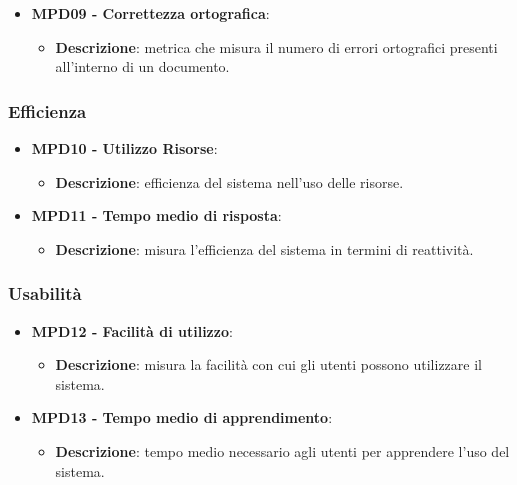 \documentclass[10pt]{article}
\begin{document}
\begin{justify}
\begin{itemize}
    \item \textbf{MPD09 - Correttezza ortografica}:
    \begin{itemize}
        \item \textbf{Descrizione}: metrica che misura il numero di errori ortografici presenti all'interno di un documento.
    \end{itemize}
\end{itemize}

\subsubsection{Efficienza}
\begin{itemize}
    \item \textbf{MPD10 - Utilizzo Risorse}:
    \begin{itemize}
        \item \textbf{Descrizione}: efficienza del sistema nell'uso delle risorse.
    \end{itemize}
    \item \textbf{MPD11 - Tempo medio di risposta}:
    \begin{itemize}
        \item \textbf{Descrizione}: misura l'efficienza del sistema in termini di reattività.
    \end{itemize}
\end{itemize}

\subsubsection{Usabilità}
\begin{itemize}
    \item \textbf{MPD12 - Facilità di utilizzo}:
        \begin{itemize}
            \item \textbf{Descrizione}:  misura la facilità con cui gli utenti possono utilizzare il sistema.
        \end{itemize}
    \item \textbf{MPD13 - Tempo medio di apprendimento}:
        \begin{itemize}
            \item \textbf{Descrizione}: tempo medio necessario agli utenti per apprendere l'uso del sistema.
        \end{itemize}
\end{itemize}


\end{justify}
\end{document}
